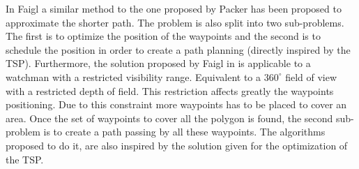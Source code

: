 
In Faigl  \citep{235*faigl2010}  a similar method to the one proposed by Packer \citep{53*packer2008} has been proposed to approximate the shorter path. The problem is also split into two sub-problems. The first is to optimize the position of the waypoints and the second is to schedule the position in order to create a path planning (directly inspired by the TSP). 
 Furthermore, the solution proposed by Faigl in \citep{235*faigl2010} is applicable to a watchman with a restricted visibility range. Equivalent to a $360^\circ$ field of view with a restricted depth of field. This restriction affects greatly the waypoints positioning. Due to this constraint more waypoints has to be placed to cover an area.
 Once the set of waypoints to cover all the polygon is found, the second sub-problem is to create a path passing by all these waypoints.  The algorithms proposed  to do it, are also inspired by the solution given for the optimization of the TSP.



